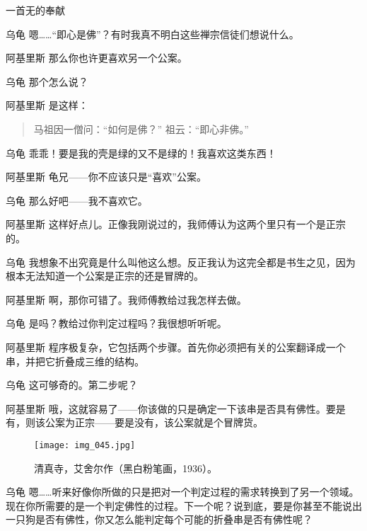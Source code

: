 \begin{dialog}{一首无的奉献\label{abcd}}
\begin{dialogue}
\item[乌龟]嗯……“即心是佛”？有时我真不明白这些禅宗信徒们想说什么。

\item[阿基里斯]那么你也许更喜欢另一个公案。

\item[乌龟]那个怎么说？

\item[阿基里斯]是这样：
\begin{quote}
马祖因一僧问：“如何是佛？”
祖云：“即心非佛。”
\end{quote}

\item[乌龟]乖乖！要是我的壳是绿的又不是绿的！我喜欢这类东西！

\item[阿基里斯]龟兄——你不应该只是“喜欢”公案。

\item[乌龟]那么好吧——我不喜欢它。

\item[阿基里斯]这样好点儿。正像我刚说过的，我师傅认为这两个里只有一个是正宗的。

\item[乌龟]我想象不出究竟是什么叫他这么想。反正我认为这完全都是书生之见，因为根本无法知道一个公案是正宗的还是冒牌的。

\item[阿基里斯]啊，那你可错了。我师傅教给过我怎样去做。

\item[乌龟]是吗？教给过你判定过程吗？我很想听听呢。

\item[阿基里斯]程序极复杂，它包括两个步骤。首先你必须把有关的公案翻译成一个串，并把它折叠成三维的结构。

\item[乌龟]这可够奇的。第二步呢？

\item[阿基里斯]哦，这就容易了——你该做的只是确定一下该串是否具有佛性。要是有，则该公案为正宗——要是没有，该公案就是个冒牌货。

\begin{figure}
\texttt{[image: img\_045.jpg]}
\caption[清真寺，艾舍尔作。]
  {清真寺，艾舍尔作（黑白粉笔画，1936）。}
\end{figure}

\item[乌龟]嗯……听来好像你所做的只是把对一个判定过程的需求转换到了另一个领域。现在你所需要的是一个判定佛性的过程。下一个呢？说到底，要是你甚至不能说出一只狗是否有佛性，你又怎么能判定每个可能的折叠串是否有佛性呢？


\end{dialogue}
\end{dialog}
